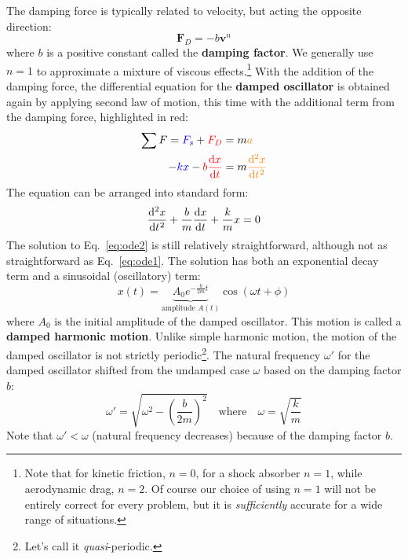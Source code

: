 The damping force is typically related to velocity, but acting the opposite
direction:
\begin{equation}
  \bm F_D=-b\bm v^n
\end{equation}
where $b$ is a positive constant called the \textbf{damping factor}. We
generally use $n=1$ to approximate a mixture of viscous effects.\footnote{Note
that for kinetic friction, $n=0$, for a shock absorber $n=1$, while aerodynamic
drag, $n=2$. Of course our choice of using $n=1$ will not be entirely correct
for every problem, but it is \emph{sufficiently} accurate for a wide range of
situations.} With the addition of the damping force, the differential equation
for the \textbf{damped oscillator} is obtained again by applying second law of
motion, this time with the additional term from the damping force, highlighted
in red:
\begin{align}
  \sum F = {\color{blue}F_s} + {\color{red}F_D} &= m{\color{orange}a}\nonumber\\
  -{\color{blue}kx}-{\color{red}b\diff xt} &= m{\color{orange}\diff[2]xt}
\end{align}
The equation can be arranged into standard form:
\begin{equation}  
  \diff[2]xt+\frac bm\diff xt+\frac kmx=0
  \label{eq:ode2}
\end{equation}
The solution to Eq.~\ref{eq:ode2} is still relatively straightforward, although
not as straightforward as Eq.~\ref{eq:ode1}. The solution has both an
exponential decay term and a sinusoidal (oscillatory) term:
\begin{equation}
  \boxed{
    x(t)=
    \underbrace{A_0 e^{-\frac b{2m}t}}_\text{amplitude $A(t)$}\cos(\omega t+\phi)
  }
  \label{eq:damped-solution}
\end{equation}
where $A_0$ is the initial amplitude of the damped oscillator. This motion is
called a \textbf{damped harmonic motion}.
Unlike simple harmonic motion, the motion of the damped oscillator is not
strictly periodic\footnote{Let's call it \emph{quasi}-periodic.}. The natural
frequency $\omega'$ for the damped oscillator shifted from the undamped case
$\omega$ based on the damping factor $b$:
\begin{equation}
  \boxed{
    \omega'=\sqrt{\omega^2-\left(\frac b{2m}\right)^2}
  }\quad\text{where}\quad
  \omega=\sqrt{\frac km}
  \label{damping1}
\end{equation}
Note that $\omega'<\omega$ (natural frequency decreases) because of the
damping factor $b$.

